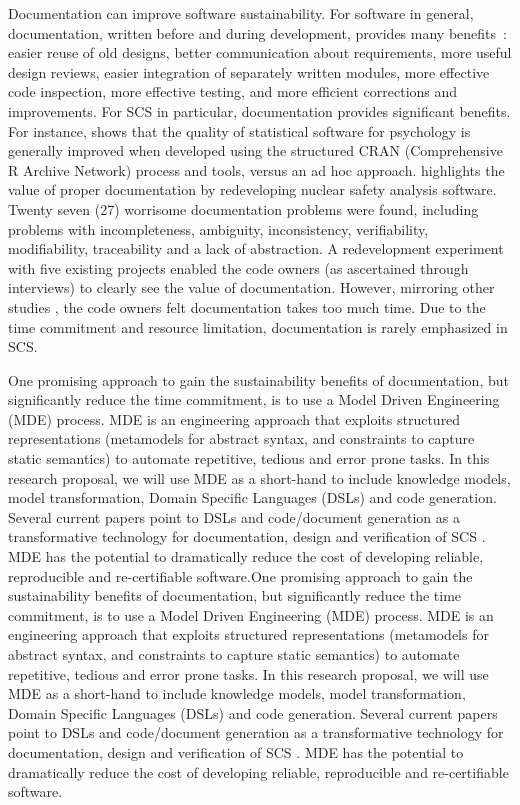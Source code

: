 \documentclass[12pt]{article}
\begin{document}
Documentation can improve software sustainability.  For software in general,
documentation, written before and during development, provides many
benefits~\cite{Parnas2010}: easier reuse of old designs, better communication
about requirements, more useful design reviews, easier integration of separately
written modules, more effective code inspection, more effective testing, and
more efficient corrections and improvements. For SCS in particular,
documentation provides significant benefits.  For instance,
\citet{SmithEtAl2015-SS-TR} shows that the quality of statistical software for
psychology is generally improved when developed using the structured CRAN
(Comprehensive R Archive Network) process and tools, versus an ad hoc approach.
\citet{SmithAndKoothoor2016} highlights the value of proper documentation by
redeveloping nuclear safety analysis software.  Twenty seven (27) worrisome
documentation problems were found, including problems with incompleteness,
ambiguity, inconsistency, verifiability, modifiability, traceability and a lack
of abstraction.  A redevelopment experiment with five existing projects
\citep{SmithJegatheesanAndKelly2016} enabled the code owners (as ascertained
through interviews) to clearly see the value of documentation.  However,
mirroring other studies \citep{CarverEtAl2007}, the code owners felt
documentation takes too much time.  Due to the time commitment and resource
limitation, documentation is rarely emphasized in SCS.

One promising approach to gain the sustainability benefits of documentation, but
significantly reduce the time commitment, is to use a Model Driven Engineering
(MDE) process.  MDE is an engineering approach that exploits structured
representations (metamodels for abstract syntax, and constraints to capture
static semantics) to automate repetitive, tedious and error prone tasks.  In
this research proposal, we will use MDE as a short-hand to include knowledge
models, model transformation, Domain Specific Languages (DSLs) and code
generation.  Several current papers point to DSLs and code/document generation
as a transformative technology for documentation, design and verification of SCS
\citep{JohansonAndHasselbring2018, Smith2018}.  MDE has the potential to
dramatically reduce the cost of developing reliable, reproducible and
re-certifiable software.One promising approach to gain the sustainability benefits of documentation, but
significantly reduce the time commitment, is to use a Model Driven Engineering
(MDE) process.  MDE is an engineering approach that exploits structured
representations (metamodels for abstract syntax, and constraints to capture
static semantics) to automate repetitive, tedious and error prone tasks.  In
this research proposal, we will use MDE as a short-hand to include knowledge
models, model transformation, Domain Specific Languages (DSLs) and code
generation.  Several current papers point to DSLs and code/document generation
as a transformative technology for documentation, design and verification of SCS
\citep{JohansonAndHasselbring2018, Smith2018}.  MDE has the potential to
dramatically reduce the cost of developing reliable, reproducible and
re-certifiable software.
\end{document}
